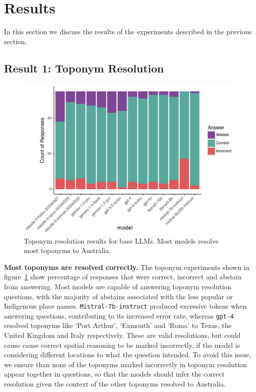 

\section{Results}
\label{section:results}

In this section we discuss the results of the experiments described in the previous section.

\subsection{Result 1: Toponym Resolution}

\begin{figure}
    \centering
    \includegraphics[width=\columnwidth]{figures/toponym_bar_country}
    \caption{Toponym resolution results for base LLMs. Most models resolve most toponyms to Australia. }
    \label{fig:toponym}
\end{figure}

\textbf{Most toponyms are resolved correctly.}
The toponym experiments shown in figure~\ref{fig:toponym} show percentage of responses that were correct, incorrect and abstain from answering. 
Most models are capable of answering toponym resolution questions, with the majority of abstains associated with the less popular or Indigenous place names. 
\texttt{Mistral-7b-instruct} produced excessive tokens when answering questions, contributing to its increased error rate, whereas \texttt{gpt-4} resolved toponyms like `Port Arthur', `Exmouth' and `Roma' to Texas, the United Kingdom and Italy respectively.
These are valid resolutions, but could cause cause correct spatial reasoning to be marked incorrectly, if the model is considering different locations to what the question intended.
To avoid this issue, we ensure than none of the toponyms marked incorrectly in toponym resolution appear together in questions, so that the models should infer the correct resolution given the context of the other toponyms resolved to Australia.



